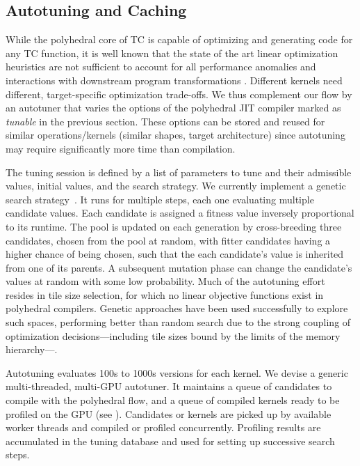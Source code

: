 \subsection{Autotuning and Caching\label{sec:autotuning}}

While the polyhedral core of TC is capable of optimizing and
generating code for any TC function, it is well known that the state
of the art linear optimization heuristics are not sufficient to
account for all performance anomalies and interactions with downstream
program transformations \cite{Zinenko2018Spatial,KongVocabulary}.
Different kernels need different, target-specific optimization trade-offs.
We thus complement our flow by an autotuner that varies the options of the
polyhedral JIT compiler marked as \emph{tunable} in the previous section.
These options can be stored and reused for similar
operations/kernels (similar shapes, target architecture) since autotuning may
require significantly more time than compilation.

The tuning session is defined by a list of parameters to tune and
their admissible values, initial values, and the search strategy.  We
currently implement a genetic search strategy~\cite{Goldberg1989}.  It
runs for multiple steps, each one evaluating multiple candidate
values.  Each candidate is assigned a fitness value inversely
proportional to its runtime.  The pool is updated on each generation
by cross-breeding three candidates, chosen from the pool at random,
with fitter candidates having a higher chance of being chosen, such
that the each candidate's value is inherited from one of its parents.
A subsequent mutation phase can change the candidate's values at
random with some low probability. Much of the autotuning effort
resides in tile size selection, for which no linear objective
functions exist in polyhedral compilers. Genetic approaches have been
used successfully to explore such spaces, performing better than
random search due to the strong coupling of optimization
decisions---including tile sizes bound by the limits of the memory
hierarchy---\cite{Pou11,autotvm}.

Autotuning evaluates 100s to 1000s versions for each kernel.  We devise a
generic multi-threaded, multi-GPU autotuner.  It
maintains a queue of candidates to compile with the polyhedral flow, and a
queue of compiled kernels ready to be profiled on the GPU (see
).  Candidates or kernels are picked up by available
worker threads and compiled or profiled concurrently.  Profiling results are
accumulated in the tuning database and used for setting up successive search
steps.

